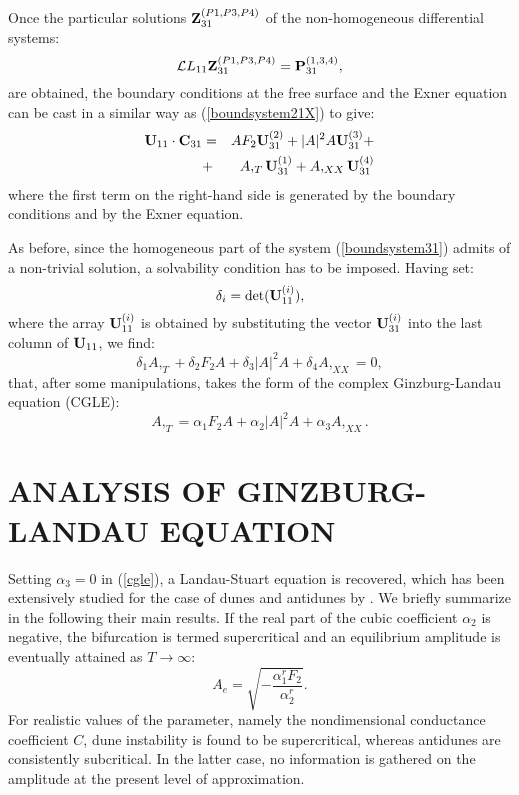 \documentclass[12pt,a4paper,twocolumn,fleqn]{narms}
\begin{document}
Once the particular solutions $\hbox{\bf Z}_{31}^{(P1,P3,P4)}$ of
the non-homogeneous differential systems:
\begin{equation}
\hbox{${\pcal L}$}{L}_{11} \hbox{\bf Z}_{31}^{(P1,P3,P4)} =
\hbox{\bf P}^{(1,3,4)}_{31},\label{boundsystem21X}
\end{equation}
are obtained, the boundary conditions at the free surface and the
Exner equation can be cast in a similar way as (\ref{boundsystem21X})
to give:
\begin{eqnarray}
\hbox{\bf U}_{11}\cdot \hbox{\bf C}_{31} &=&
 A F_2 \hbox{\bf U}_{31}^{(2)}
+ |A|^2A \hbox{\bf U}_{31}^{(3)} + \label{boundsystem31}
\\
&+& A,_T \hbox{\bf U}_{31}^{(1)} + A,_{XX} \hbox{\bf U}_{31}^{(4)}
\nonumber
\end{eqnarray}
where the first term on the right-hand side is generated by the
boundary conditions and by the Exner equation.

As before, since the homogeneous part of the system
(\ref{boundsystem31}) admits of a non-trivial solution, a solvability
condition has to be imposed. Having set:
\begin{equation}
\delta_i = \det(\hbox{\bf U}^{(i)}_{11}),
\end{equation}
where the array $\hbox{\bf U}^{(i)}_{11}$ is  obtained by
substituting the vector $\hbox{\bf U}^{(i)}_{31}$ into the last
column of $\hbox{\bf U}_{11}$, we find:
\begin{equation}
\delta_1 A,_T + \delta_2 F_2 A + \delta_3  |A|^2A +
\delta_4 A,_{XX} = 0,
\end{equation}
that, after some manipulations, takes the form of the complex
Ginzburg-Landau equation (CGLE):
\begin{equation}
A,_T = \alpha_1 F_2 A + \alpha_2 |A|^2 A +\alpha_3 A,_{XX}.
\label{cgle}
\end{equation}

\section{ANALYSIS OF GINZBURG-LANDAU EQUATION}
\label{ancgle}

Setting $\alpha_3=0$ in (\ref{cgle}), a Landau-Stuart equation is
recovered, which has been extensively studied for the case of dunes
and antidunes by . We briefly summarize in the following
their main results. If the real part of the cubic coefficient
$\alpha_2$ is negative, the bifurcation is termed supercritical and an
equilibrium amplitude is eventually attained as $T \rightarrow
\infty$:
\begin{equation}
A_e=\sqrt{-\frac{\alpha_1^r F_2 }{\alpha_2^r}}.
\label{equilibrium}
\end{equation}
For realistic values of the parameter, namely the nondimensional
conductance coefficient $C$, dune instability is found to be
supercritical, whereas antidunes are consistently subcritical. In the
latter case, no information is gathered on the amplitude at the
present level of approximation.
\end{document}
